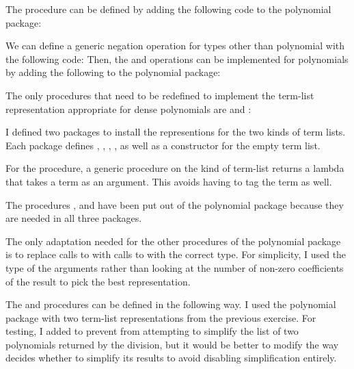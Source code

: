 \begin{exe}[2.87]
    The  procedure can be defined by adding the following code to 
    the polynomial package:
\end{exe}

\begin{exe}[2.88]
    We can define a generic negation operation  for types other than 
    polynomial with the following code:
    Then, the  and  operations can be implemented for 
    polynomials by adding the following to the polynomial package:
\end{exe}

\begin{exe}[2.89]
    The only procedures that need to be redefined to implement the term-list 
    representation appropriate for dense polynomials are  and 
    :
\end{exe}

\begin{exe}[2.90]
    I defined two packages to install the representions for the two kinds of 
    term lists. Each package defines , , 
    , , as well as a constructor for the 
    empty term list.

    For the  procedure, a generic procedure on the kind of 
    term-list returns a lambda that takes a term as an argument. This avoids 
    having to tag the term as well.

    The procedures ,  and  have been put 
    out of the polynomial package because they are needed in all three packages.

    The only adaptation needed for the other procedures of the polynomial 
    package is to replace calls to  with calls to 
     with the correct type. For simplicity, I used the 
    type of the arguments rather than looking at the number of non-zero 
    coefficients of the result to pick the best representation.
\end{exe}

\begin{exe}[2.91]
    The  and  procedures can be defined in the 
    following way. I used the polynomial package with two term-list 
    representations from the previous exercise. For testing, I added
     to prevent  from 
    attempting to simplify the list of two polynomials returned by the division, 
    but it would be better to modify the way  decides 
    whether to simplify its results to avoid disabling simplification entirely.
\end{exe}

